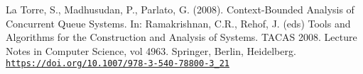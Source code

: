 \documentclass[a4paper,UKenglish,cleveref, autoref, thm-restate]{lipics-v2019}
\begin{document}
\begin{thebibliography}{9}

    La Torre, S., Madhusudan, P., Parlato, G. (2008). Context-Bounded Analysis of Concurrent Queue Systems. In: Ramakrishnan, C.R., Rehof, J. (eds) Tools and Algorithms for the Construction and Analysis of Systems. TACAS 2008. Lecture Notes in Computer Science, vol 4963. Springer, Berlin, Heidelberg. \href{https://doi.org/10.1007/978-3-540-78800-3_21}{\texttt{https://doi.org/10.1007/978-3-540-78800-3\_21}}


    \end{thebibliography}
\end{document}
